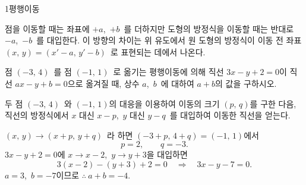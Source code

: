 \documentclass[10pt]{article}
\begin{document}
\begin{dmconcept}{1}{평행이동}
\begin{dmnote}
점을 이동할 때는 좌표에 $+a$,\ $+b$\ 를 더하지만 도형의 방정식을 이동할 때는 반대로 $-a$,\ $-b$\ 를 대입한다. 이 방향의 차이는 위 유도에서 원 도형의 방정식이 이동 전 좌표 $(x,\, y) = (x' - a,\, y' - b)$\ 로 표현되는 데에서 나온다.
\end{dmnote}

\end{dmconcept}

\newpage


\begin{dmproblem}
점 $(-3,\, 4)$\ 를 점 $(-1,\, 1)$\ 로 옮기는 평행이동에 의해 직선 $3x - y + 2 = 0$이 직선 $ax - y + b = 0$으로 옮겨질 때, 상수 $a$,\ $b$\ 에 대하여 $a + b$의 값을 구하시오.
\end{dmproblem}

\begin{dmapproach}
두 점 $(-3,\, 4)$\ 와 $(-1,\, 1)$의 대응을 이용하여 이동의 크기 $(p,\, q)$를 구한 다음, 직선의 방정식에서 $x$ 대신 $x - p$,\ $y$ 대신 $y - q$\ 를 대입하여 이동한 직선을 얻는다.
\end{dmapproach}

\begin{dmsolution}
$(x,\, y) \to (x + p,\, y + q)$\ 라 하면 $(-3 + p,\, 4 + q) = (-1,\, 1)$에서
\begin{equation*}
  p = 2,\qquad q = -3.
\end{equation*}
$3x - y + 2 = 0$에 $x \to x - 2$,\ $y \to y + 3$을 대입하면
\begin{equation*}
  3(x - 2) - (y + 3) + 2 = 0 \quad\Longrightarrow\quad 3x - y - 7 = 0.
\end{equation*}
$a = 3$,\ $b = -7$이므로 $\therefore\ a + b = -4$.
\end{dmsolution}

\dmchecktitle


\end{document}
